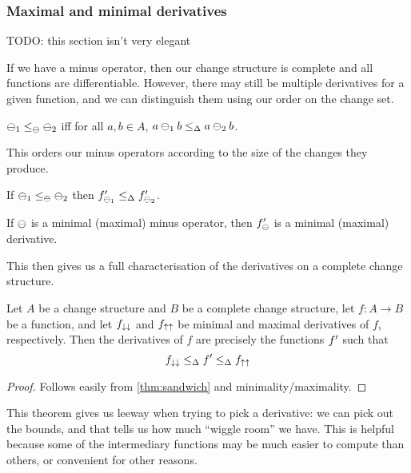 \subsubsection{Maximal and minimal derivatives}

TODO: this section isn't very elegant

If we have a minus operator, then our change structure is complete and all
functions are differentiable. However, there may still be multiple derivatives
for a given function, and we can distinguish them using our order on the change
set.

\begin{defn}
  $\ominus_1 \leq_\ominus \ominus_2$ iff for all $a,b \in A$, $a \ominus_1 b
  \leq_\Delta a \ominus_2 b$.
\end{defn}

This orders our minus operators according to the size of the changes they
produce. 

\begin{prop}
  If $\ominus_1 \leq_\ominus \ominus_2$ then
  $f'_{\ominus_1} \leq_\Delta f'_{\ominus_2}$.
\end{prop}

\begin{prop}
  If $\ominus$ is a minimal (maximal) minus operator, then $f'_\ominus$
  is a minimal (maximal) derivative.
\end{prop}

This then gives us a full characterisation of the derivatives on a complete
change structure.

\begin{thm}
\label{thm:derivativeCharacterization}
  Let $A$ be a change structure and $B$ be a complete change structure, let
  $f: A \rightarrow B$ be a function, and let $f_{\downarrow\downarrow}$ and
  $f_{\uparrow\uparrow}$ be minimal and maximal derivatives of $f$, respectively.
  Then the derivatives of $f$ are precisely
  the functions $f'$ such that
  $$f_{\downarrow\downarrow} \leq_\Delta f' \leq_\Delta f_{\uparrow\uparrow}$$
\end{thm}
\begin{proof}
  Follows easily from \ref{thm:sandwich} and minimality/maximality.
\end{proof}

This theorem gives us leeway when trying to pick a derivative: we can pick out the
bounds, and that tells us how much ``wiggle room'' we have. This is helpful
because some of the intermediary functions may be much easier to compute than
others, or convenient for other reasons.

